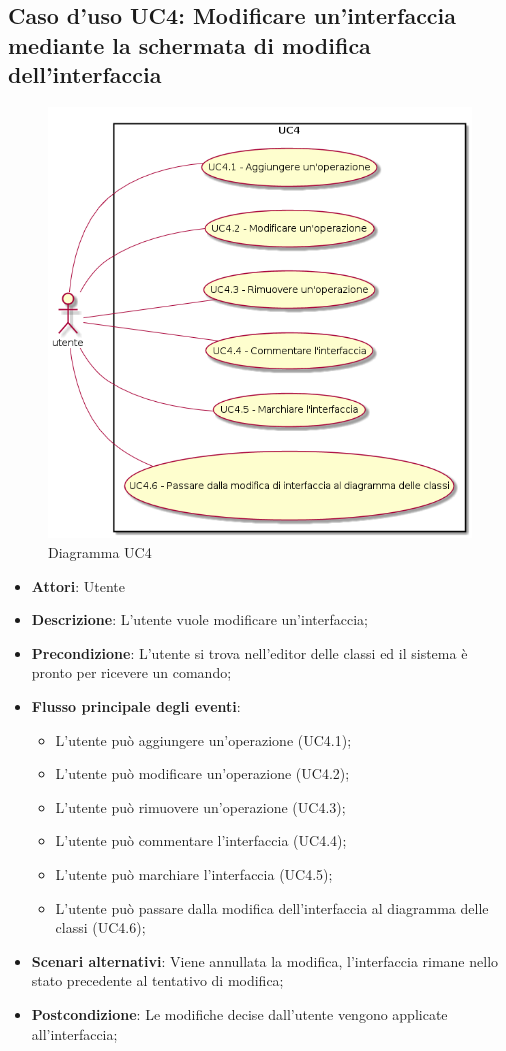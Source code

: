 \documentclass[../AnalisiDeiRequisiti.tex]{subfiles}
\begin{document}
			\subsection{Caso d'uso UC4: Modificare un'interfaccia mediante la schermata di modifica dell'interfaccia}
			\begin{figure} [H]
				\centering
				\includegraphics[scale=0.45]{./Figures/UC4.png}
				\caption{Diagramma UC4}\label{}
			\end{figure}
			\begin{itemize}
				\item \textbf{Attori}: Utente
				\item \textbf{Descrizione}: L'utente vuole modificare un'interfaccia;
				\item \textbf{Precondizione}: L'utente si trova nell'editor delle classi ed il sistema è pronto per ricevere un comando;
				\item \textbf{Flusso principale degli eventi}: \begin{itemize}
					\item L'utente può aggiungere un'operazione (UC4.1);
					\item L'utente può modificare un'operazione (UC4.2);
					\item L'utente può rimuovere un'operazione (UC4.3);
					\item L'utente può commentare l'interfaccia (UC4.4);
					\item L'utente può marchiare l'interfaccia (UC4.5);
					\item L'utente può passare dalla modifica dell'interfaccia al diagramma delle classi (UC4.6);
				\end{itemize}
				\item \textbf{Scenari alternativi}: Viene annullata la modifica, l'interfaccia rimane nello stato precedente al tentativo di modifica;
				\item \textbf{Postcondizione}: Le modifiche decise dall'utente vengono applicate all'interfaccia;
			\end{itemize}
\end{document}
